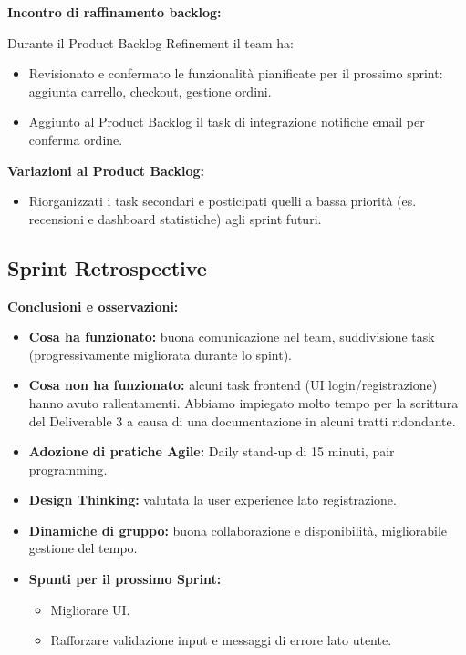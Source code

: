 \textbf{Incontro di raffinamento backlog:}

Durante il Product Backlog Refinement il team ha:
\begin{itemize}
    \item Revisionato e confermato le funzionalità pianificate per il prossimo sprint: aggiunta carrello, checkout, gestione ordini.
    \item Aggiunto al Product Backlog il task di integrazione notifiche email per conferma ordine.
\end{itemize}

\textbf{Variazioni al Product Backlog:}
\begin{itemize}
    \item Riorganizzati i task secondari e posticipati quelli a bassa priorità (es. recensioni e dashboard statistiche) agli sprint futuri.
\end{itemize}

\vspace{0.5cm}

\subsection{Sprint Retrospective}

\textbf{Conclusioni e osservazioni:}
\begin{itemize}
    \item \textbf{Cosa ha funzionato:} buona comunicazione nel team, suddivisione task (progressivamente migliorata durante lo spint).
    \item \textbf{Cosa non ha funzionato:} alcuni task frontend (UI login/registrazione) hanno avuto rallentamenti. Abbiamo impiegato molto tempo per la scrittura del Deliverable 3 a causa di una documentazione in alcuni tratti ridondante.
    \item \textbf{Adozione di pratiche Agile:} Daily stand-up di 15 minuti, pair programming.
    \item \textbf{Design Thinking:} valutata la user experience lato registrazione.
    \item \textbf{Dinamiche di gruppo:} buona collaborazione e disponibilità, migliorabile gestione del tempo.
    \item \textbf{Spunti per il prossimo Sprint:}
    \begin{itemize}
        \item Migliorare UI.
        \item Rafforzare validazione input e messaggi di errore lato utente.
    \end{itemize}
\end{itemize}